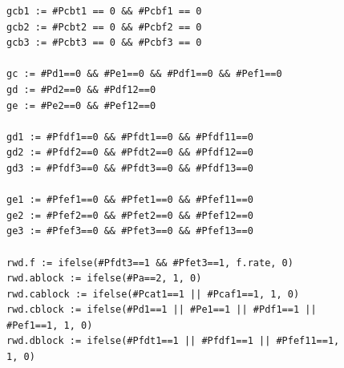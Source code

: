 \begin{figure}[tp]
\begin{small}
\begin{verbatim}
gcb1 := #Pcbt1 == 0 && #Pcbf1 == 0
gcb2 := #Pcbt2 == 0 && #Pcbf2 == 0
gcb3 := #Pcbt3 == 0 && #Pcbf3 == 0

gc := #Pd1==0 && #Pe1==0 && #Pdf1==0 && #Pef1==0
gd := #Pd2==0 && #Pdf12==0
ge := #Pe2==0 && #Pef12==0

gd1 := #Pfdf1==0 && #Pfdt1==0 && #Pfdf11==0
gd2 := #Pfdf2==0 && #Pfdt2==0 && #Pfdf12==0
gd3 := #Pfdf3==0 && #Pfdt3==0 && #Pfdf13==0

ge1 := #Pfef1==0 && #Pfet1==0 && #Pfef11==0
ge2 := #Pfef2==0 && #Pfet2==0 && #Pfef12==0
ge3 := #Pfef3==0 && #Pfet3==0 && #Pfef13==0

rwd.f := ifelse(#Pfdt3==1 && #Pfet3==1, f.rate, 0)
rwd.ablock := ifelse(#Pa==2, 1, 0)
rwd.cablock := ifelse(#Pcat1==1 || #Pcaf1==1, 1, 0)
rwd.cblock := ifelse(#Pd1==1 || #Pe1==1 || #Pdf1==1 || #Pef1==1, 1, 0)
rwd.dblock := ifelse(#Pfdt1==1 || #Pfdf1==1 || #Pfef11==1, 1, 0)

\end{verbatim}
\end{small}
\end{figure}

